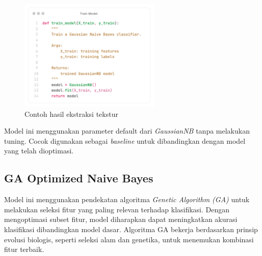 \begin{figure}[H]
  \centering
  \includegraphics[width=0.6\textwidth]{figure/chapter-4-train_model.png}
  \caption{Contoh hasil ekstraksi tekstur}
  \label{fig:extract_rgb}
\end{figure}

Model ini menggunakan parameter default dari \textit{GaussianNB} tanpa melakukan tuning. Cocok digunakan sebagai \textit{baseline} untuk dibandingkan dengan model yang telah dioptimasi.


\subsection{GA Optimized Naive Bayes} \label{IV.GA Optimized Naive Bayes}
Model ini menggunakan pendekatan algoritma \textit{Genetic Algorithm (GA)} untuk melakukan seleksi fitur yang paling relevan terhadap klasifikasi. Dengan mengoptimasi subset fitur, model diharapkan dapat meningkatkan akurasi klasifikasi dibandingkan model dasar. Algoritma GA bekerja berdasarkan prinsip evolusi biologis, seperti seleksi alam dan genetika, untuk menemukan kombinasi fitur terbaik.

